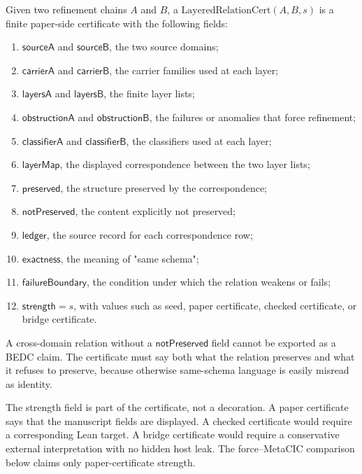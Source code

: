 \begin{definition}
\label{def:layered-relation-certificate}
Given two refinement chains $A$ and $B$, a $\mathrm{LayeredRelationCert}(A,B,s)$ is a finite paper-side certificate with the following fields:
\begin{enumerate}
\item $\mathsf{sourceA}$ and $\mathsf{sourceB}$, the two source domains;
\item $\mathsf{carrierA}$ and $\mathsf{carrierB}$, the carrier families used at each layer;
\item $\mathsf{layersA}$ and $\mathsf{layersB}$, the finite layer lists;
\item $\mathsf{obstructionA}$ and $\mathsf{obstructionB}$, the failures or anomalies that force refinement;
\item $\mathsf{classifierA}$ and $\mathsf{classifierB}$, the classifiers used at each layer;
\item $\mathsf{layerMap}$, the displayed correspondence between the two layer lists;
\item $\mathsf{preserved}$, the structure preserved by the correspondence;
\item $\mathsf{notPreserved}$, the content explicitly not preserved;
\item $\mathsf{ledger}$, the source record for each correspondence row;
\item $\mathsf{exactness}$, the meaning of "same schema";
\item $\mathsf{failureBoundary}$, the condition under which the relation weakens or fails;
\item $\mathsf{strength}=s$, with values such as seed, paper certificate, checked certificate, or bridge certificate.
\end{enumerate}
\end{definition}

\begin{principle}
\label{prin:layered-relation-exactness-before-export}
A cross-domain relation without a $\mathsf{notPreserved}$ field cannot be exported as a BEDC claim. The certificate must say both what the relation preserves and what it refuses to preserve, because otherwise same-schema language is easily misread as identity.
\end{principle}

The strength field is part of the certificate, not a decoration. A paper certificate says that the manuscript fields are displayed. A checked certificate would require a corresponding Lean target. A bridge certificate would require a conservative external interpretation with no hidden host leak. The force--MetaCIC comparison below claims only paper-certificate strength.

